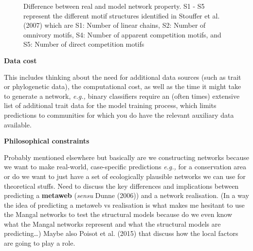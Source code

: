 \documentclass[
]{article}
\begin{document}
\begin{tcolorbox}
\begin{figure}[H]


\caption{\label{fig-topology}Difference between real and model network
property. S1 - S5 represent the different motif structures identified in
Stouffer et al. (2007) which are S1: Number of linear chains, S2: Number
of omnivory motifs, S4: Number of apparent competition motifs, and S5:
Number of direct competition motifs}

\end{figure}%

\textbf{Data cost}

This includes thinking about the need for additional data sources (such
as trait or phylogenetic data), the computational cost, as well as the
time it might take to generate a network, \emph{e.g.,} binary
classifiers require an (often times) extensive list of additional trait
data for the model training process, which limits predictions to
communities for which you do have the relevant auxiliary data available.

\textbf{Philosophical constraints}

Probably mentioned elsewhere but basically are we constructing networks
because we want to make real-world, case-specific predictions
\emph{e.g.,} for a conservation area or do we want to just have a set of
ecologically plausible networks we can use for theoretical stuffs. Need
to discuss the key differences and implications between predicting a
\textbf{metaweb} (\emph{sensu} Dunne (2006)) and a network realisation.
(In a way the idea of predicting a metaweb vs realisation is what makes
me hesitant to use the Mangal networks to test the structural models
because do we even know what the Mangal networks represent and what the
structural models are predicting\ldots) Maybe also Poisot et al. (2015)
that discuss how the local factors are going to play a role.


\end{tcolorbox}
\end{document}
